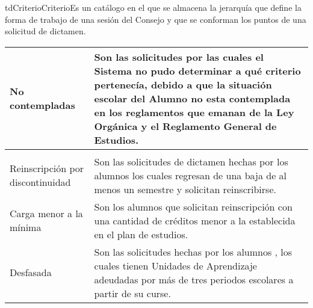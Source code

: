 \begin{TipoDeDato}{tdCriterio}{Criterio}{Es un catálogo en el que se almacena la jerarquía que define la forma de trabajo de una sesión del Consejo y que se conforman los puntos de una solicitud de dictamen.}
\begin{longtable}{| p{} | p{} |}
	 			\hline
	 			No contempladas & Son las solicitudes por las cuales el Sistema no pudo determinar a qué criterio pertenecía, debido a que la situación escolar del Alumno no esta contemplada en los reglamentos que emanan de la Ley Orgánica y el Reglamento General de Estudios.   \\
	 			\hline
	 			\rowcolor{colorSecundario}
	 			\multicolumn{2}{|c|}{\color{white}Los criterios aplicables al CTCE son}\\
	 			\hline
	 			Reinscripción por discontinuidad & Son las solicitudes de dictamen hechas por los alumnos los cuales regresan de una baja de al menos un semestre y solicitan reinscribirse.\\
	 			\hline
	 			Carga menor a la mínima & Son los alumnos que solicitan reinscripción con una cantidad de créditos menor a la establecida en el plan de estudios.\\
	 			\hline
	 			Desfasada & Son las solicitudes hechas por los alumnos , los cuales tienen Unidades de Aprendizaje adeudadas por más de tres periodos escolares a partir de su curse.\\
	 			\hline
	 		\end{longtable}
	\end{TipoDeDato}

